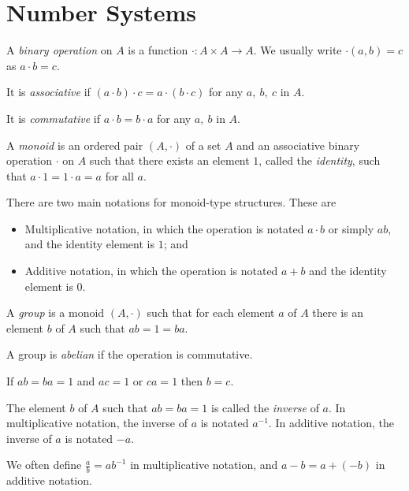 \chapter{Number Systems}
  \begin{defn}
    A \emph{binary operation} on $A$ is a function $\cdot:A\times A\to A$. We
    usually write $\cdot(a,b)=c$ as $a\cdot b=c$.

    It is \emph{associative} if $(a\cdot b)\cdot c=a\cdot(b\cdot
    c)$ for any $a,\ b,\ c$ in $A$.

    It is \emph{commutative} if $a\cdot b=b\cdot a$ for any $a,\ b$ in $A$.
  \end{defn}
  \begin{defn}
    A \emph{monoid} is an ordered pair $(A,\cdot)$ of a set $A$ and an
    associative binary
    operation $\cdot$ on $A$ such that there exists an element $1$, called the
    \emph{identity}, such that $a\cdot 1=1\cdot a=a$ for all $a$.
  \end{defn}
  \begin{rem}
    There are two main notations for monoid-type structures. These are
    \begin{itemize}
      \item 
        Multiplicative notation, in which the operation is notated $a\cdot b$ or
        simply $ab$, and the identity element is $1$; and
      \item Additive notation, in which the operation is notated $a+b$ and the
        identity element is $0$.
    \end{itemize}
  \end{rem}
  \begin{defn}
    A \emph{group} is a monoid $(A,\cdot)$ such that for each element $a$ of $A$
    there is an element $b$ of $A$ such that
    $ab=1=ba$.
    
    A group is \emph{abelian} if the operation is commutative.
  \end{defn}
  \begin{prop}
    If $ab=ba=1$ and $ac=1$ or $ca=1$ then $b=c$.
  \end{prop}
  \begin{defn}
    The element $b$ of $A$ such that $ab=ba=1$ is called the \emph{inverse} of $a$.
    In multiplicative notation, the inverse of $a$ is notated $a^{-1}$.
    In additive notation, the inverse of $a$ is notated $-a$.
  \end{defn}
  \begin{rem}
    We often define $\frac ab=ab^{-1}$ in multiplicative notation, and
    $a-b=a+(-b)$ in additive notation.
  \end{rem}
